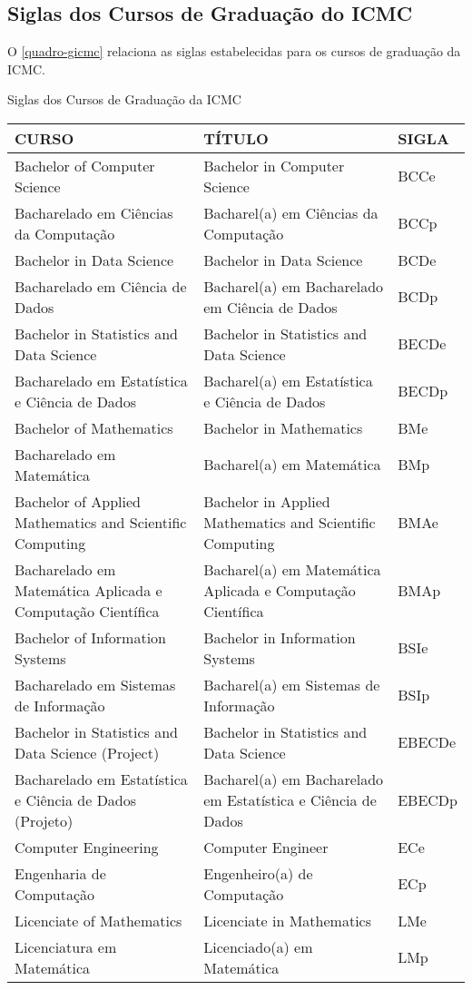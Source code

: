 \begin{apendicesenv}
\chapter{Siglas dos Cursos de Graduação do ICMC}
O \autoref{quadro-gicmc} relaciona as siglas estabelecidas para os cursos de graduação da ICMC.
\begin{quadro}[htb]
	\ABNTEXfontereduzida
	\caption[Siglas dos Cursos de Graduação da ICMC]{Siglas dos Cursos de Graduação da ICMC}
	\label{quadro-gicmc}
	\begin{tabular}{|p{6.5cm}|p{6.5cm}|p{1.75cm}|}
		\hline
		\textbf{CURSO} & \textbf{TÍTULO} &  \textbf{SIGLA}  \\
		\hline
		Bachelor of Computer Science & Bachelor in Computer Science & BCCe\\
		Bacharelado em Ciências da Computação & Bacharel(a) em Ciências da Computação & BCCp\\
		Bachelor in Data Science & Bachelor in Data Science & BCDe\\
		Bacharelado em Ciência de Dados & Bacharel(a) em Bacharelado em Ciência de Dados & BCDp\\
		Bachelor in Statistics and Data Science & Bachelor in Statistics and Data Science & BECDe\\
		Bacharelado em Estatística e Ciência de Dados & Bacharel(a) em Estatística e Ciência de Dados & BECDp\\
		Bachelor of Mathematics & Bachelor in Mathematics & BMe\\
		Bacharelado em Matemática & Bacharel(a) em Matemática & BMp\\
		Bachelor of Applied Mathematics and Scientific Computing & Bachelor in Applied Mathematics and Scientific Computing & BMAe\\
		Bacharelado em Matemática Aplicada e Computação Científica & Bacharel(a) em Matemática Aplicada e Computação Científica & BMAp\\
		Bachelor of Information Systems & Bachelor in Information Systems & BSIe\\
		Bacharelado em Sistemas de Informação & Bacharel(a) em Sistemas de Informação & BSIp\\
		Bachelor in Statistics and Data Science (Project) & Bachelor in Statistics and Data Science & EBECDe\\
		Bacharelado em Estatística e Ciência de Dados (Projeto) & Bacharel(a) em Bacharelado em Estatística e Ciência de Dados & EBECDp\\
		Computer Engineering & Computer Engineer & ECe\\
		Engenharia de Computação & Engenheiro(a) de Computação & ECp\\
		Licenciate of  Mathematics & Licenciate in Mathematics & LMe\\
		Licenciatura em Matemática & Licenciado(a) em Matemática & LMp\\
	    \hline
		

\end{tabular}
\end{quadro}
\end{apendicesenv}
